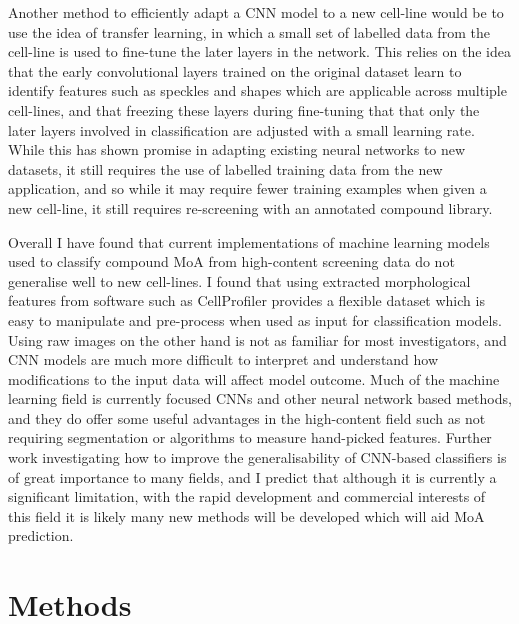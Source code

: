 \documentclass[a4paper,11pt,twoside,openright]{scrbook}
\begin{document}
Another method to efficiently adapt a CNN model to a new cell-line would be to use the idea of transfer learning, in 
which a small set of labelled data from the cell-line is used to fine-tune the later layers in the network.
This relies on the idea that the early convolutional layers trained on the original dataset learn to identify features 
such as speckles and shapes which are applicable across multiple cell-lines, and that freezing these layers during 
fine-tuning that that only the later layers involved in classification are adjusted with a small learning rate. 
\cite{Pawlowski2016,Kensert2018}
While this has shown promise in adapting existing neural networks to new datasets, it still requires the use of 
labelled training data from the new application, and so while it may require fewer training examples when given a new 
cell-line, it still requires re-screening with an annotated compound library.

Overall I have found that current implementations of machine learning models used to classify compound MoA from 
high-content screening data do not generalise well to new cell-lines.
I found that using extracted morphological features from software such as CellProfiler provides a flexible dataset 
which is easy to manipulate and pre-process when used as input for classification models.
Using raw images on the other hand is not as familiar for most investigators, and CNN models are much more difficult to 
interpret and understand how modifications to the input data will affect model outcome.
Much of the machine learning field is currently focused CNNs and other neural network based methods, and they do offer 
some useful advantages in the high-content field such as not requiring segmentation or algorithms to measure 
hand-picked features.
Further work investigating how to improve the generalisability of CNN-based classifiers is of great importance to many 
fields, and I predict that although it is currently a significant limitation, with the rapid development and commercial 
interests of this field it is likely many new methods will be developed which will aid MoA prediction.





\section{Methods}
\end{document}

